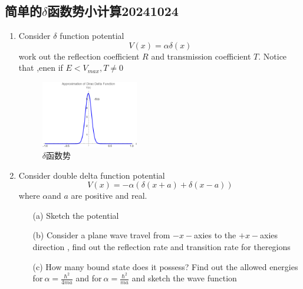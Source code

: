 \documentclass{article}
\begin{document}
\subsection{简单的$\delta$函数势小计算20241024}

\begin{enumerate}
    \item Consider $\delta$ function potential
    \begin{equation*}
        V(x)=\alpha\delta(x)
    \end{equation*}
    work out the reflection coefficient $R$ and transmission coefficient $T$.
    Notice that ,enen if $E<V_{max},T\neq 0 $
    \begin{figure}[hbtp]
        \centering
        \includegraphics[width=0.4\textwidth]{figure/delta函数势.png}
        \caption{$\delta$函数势}
        \label{fig:delta函数势}
    \end{figure}
    \item 
    Consider double delta function potential
    \begin{equation*}
        V(x)=-\alpha\left(\delta(x+a)+\delta(x-a)\right)
    \end{equation*}
    where $\alpha$and $a$ are positive and real.
    
    \begin{enumerate}
        \item[(a)] Sketch the potential
        \item[(b)] Consider a plane wave travel from $-x-$axies to the $+x-$axies direction , find out the reflection rate and transition rate for theregions
        \item[(c)] How many bound state does it possess? Find out the allowed energies for$\ \displaystyle\alpha=\frac{\hbar^2}{4ma}$ and for$\ \displaystyle\alpha=\frac{\hbar^2}{ma}$ and sketch the wave function
    \end{enumerate}
\end{enumerate}
\end{document}
